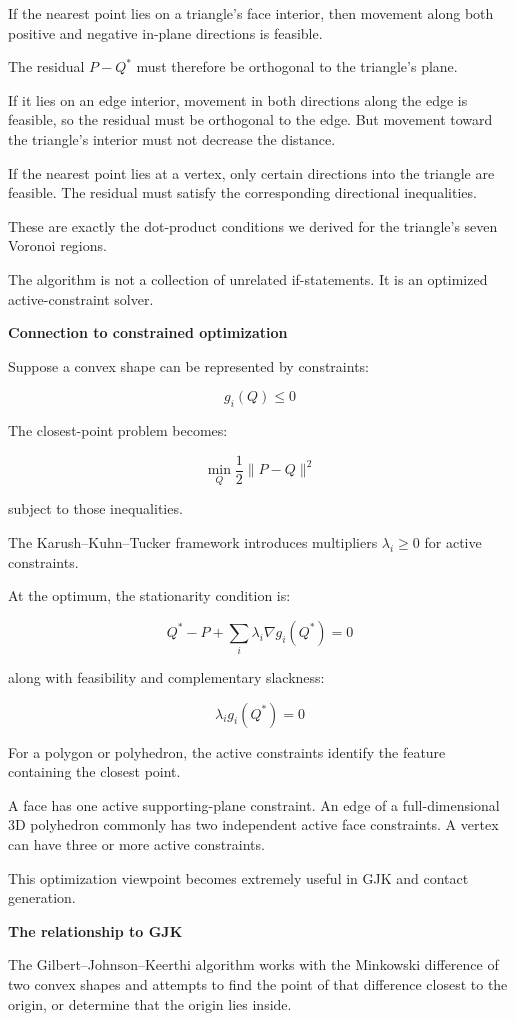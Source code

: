 If the nearest point lies on a triangle's face interior, then movement along both positive and negative in-plane directions is feasible.

The residual \(P-Q^*\) must therefore be orthogonal to the triangle's plane.

If it lies on an edge interior, movement in both directions along the edge is feasible, so the residual must be orthogonal to the edge. But movement toward the triangle's interior must not decrease the distance.

If the nearest point lies at a vertex, only certain directions into the triangle are feasible. The residual must satisfy the corresponding directional inequalities.

These are exactly the dot-product conditions we derived for the triangle's seven Voronoi regions.

The algorithm is not a collection of unrelated if-statements. It is an optimized active-constraint solver.

\textbf{Connection to constrained optimization}

Suppose a convex shape can be represented by constraints:

\[
g_i(Q)\le0
\]

The closest-point problem becomes:

\[
\min_Q \frac12\|P-Q\|^2
\]

subject to those inequalities.

The Karush--Kuhn--Tucker framework introduces multipliers \(\lambda_i\ge0\) for active constraints.

At the optimum, the stationarity condition is:

\[
Q^*-P+\sum_i\lambda_i\nabla g_i(Q^*)=0
\]

along with feasibility and complementary slackness:

\[
\lambda_i g_i(Q^*)=0
\]

For a polygon or polyhedron, the active constraints identify the feature containing the closest point.

A face has one active supporting-plane constraint. An edge of a full-dimensional 3D polyhedron commonly has two independent active face constraints. A vertex can have three or more active constraints.

This optimization viewpoint becomes extremely useful in GJK and contact generation.

\textbf{The relationship to GJK}

The Gilbert--Johnson--Keerthi algorithm works with the Minkowski difference of two convex shapes and attempts to find the point of that difference closest to the origin, or determine that the origin lies inside.

